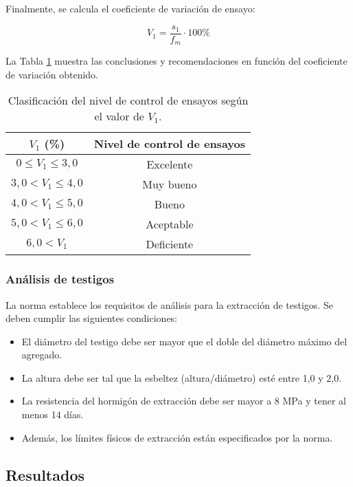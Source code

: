 Finalmente, se calcula el coeficiente de variación de ensayo:

\begin{equation}
    V_1 = \frac{s_1}{f_m} \cdot 100\%
\end{equation}

La Tabla \ref{tab:conclusiones3} muestra las conclusiones y recomendaciones en función del coeficiente de variación obtenido.

\begin{table}[H]
\centering
\begin{tabular}{|c|c|}
\hline
\textbf{$V_{1}$ (\%)} & \textbf{Nivel de control de ensayos} \\ \hline
$0 \leq V_{1} \leq 3,0$ & Excelente \\ \hline
$3,0 < V_{1} \leq 4,0$ & Muy bueno \\ \hline
$4,0 < V_{1} \leq 5,0$ & Bueno \\ \hline
$5,0 < V_{1} \leq 6,0$ & Aceptable \\ \hline
$6,0 < V_{1}$ & Deficiente \\ \hline
\end{tabular}
\caption{Clasificación del nivel de control de ensayos según el valor de $V_{1}$.}
\label{tab:conclusiones3}
\end{table}

\subsubsection{Análisis de testigos}

La norma \cite{NCh1171-1-2001} establece los requisitos de análisis para la extracción de testigos. Se deben cumplir las siguientes condiciones:

\begin{itemize}
    \item El diámetro del testigo debe ser mayor que el doble del diámetro máximo del agregado.
    \item La altura debe ser tal que la esbeltez (altura/diámetro) esté entre 1,0 y 2,0.
    \item La resistencia del hormigón de extracción debe ser mayor a 8 MPa y tener al menos 14 días.
    \item Además, los límites físicos de extracción están especificados por la norma.
\end{itemize}

\subsection{Resultados}

